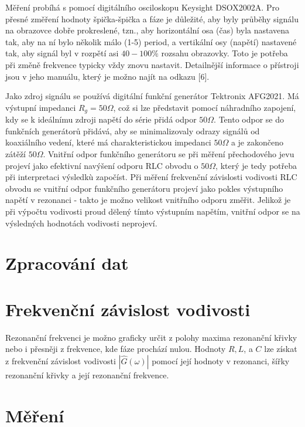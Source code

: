 \documentclass[czech,11pt,a4paper]{article}
\begin{document}
\begin{multicols}{2}
		Měření probíhá s pomocí digitálního osciloskopu Keysight DSOX2002A. Pro přesné změření hodnoty špička-špička a fáze je důležité, aby byly průběhy signálu na obrazovce dobře prokreslené, tzn., aby horizontální osa (čas) byla nastavena tak, aby na ní bylo několik málo (1-5) period, a vertikální osy (napětí) nastavené tak, aby signál byl v rozpětí asi $40-100 \%$ rozsahu obrazovky. Toto je potřeba při změně frekvence typicky vždy znovu nastavit. Detailnější informace o přístroji jsou v jeho manuálu, který je možno najít na odkazu [6].
		
		Jako zdroj signálu se používá digitální funkční generátor Tektronix AFG2021. Má výstupní impedanci $R_{g}=50 \Omega$, což si lze představit pomocí náhradního zapojení, kdy se k ideálnímu zdroji napětí do série přidá odpor $50 \Omega$. Tento odpor se do funkčních generátorů přidává, aby se minimalizovaly odrazy signálů od koaxiálního vedení, které má charakteristickou impedanci $50 \Omega$ a je zakončeno zátěží $50 \Omega$. Vnitřní odpor funkčního generátoru se při měření přechodového jevu projeví jako efektivní navýšení odporu RLC obvodu o $50 \Omega$, který je tedy potřeba při interpretaci výsledkù započíst. Při měření frekvenční závislosti vodivosti RLC obvodu se vnitřní odpor funkčního generátoru projeví jako pokles výstupního napětí v rezonanci - takto je možno velikost vnitřního odporu změřit. Jelikož je při výpočtu vodivosti proud dĕlený tímto výstupním napětím, vnitřní odpor se na výsledných hodnotách vodivosti neprojeví.
		
		\section*{Zpracování dat}
		
		\section*{Frekvenční závislost vodivosti}
		
		Rezonanční frekvenci je možno graficky určit z polohy maxima rezonanční křivky nebo i přesněji z frekvence, kde fáze prochází nulou. Hodnoty $R, L$, a $C$ lze získat z frekvenční závislost vodivosti $|\hat{G}(\omega)|$ pomocí její hodnoty v rezonanci, šířky rezonanční křivky a její rezonanční frekvence.
		\section{Měření}

\end{multicols}
\end{document}
